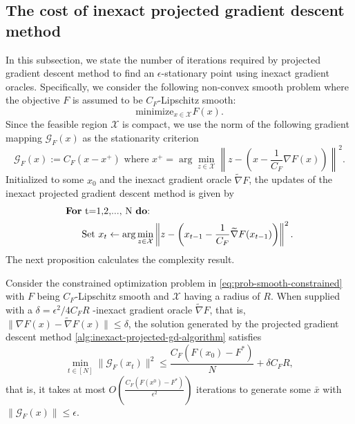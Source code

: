 \subsection{The cost of inexact projected gradient descent method}
In this subsection, we state the number of iterations required by  projected gradient descent method to find an $\epsilon$-stationary point using inexact gradient oracles. Specifically, we consider the following non-convex smooth problem  where the objective $F$ is assumed to be $C_F$-Lipschitz smooth: 
\begin{equation}\label{eq:prob-smooth-constrained}
    \mbox{minimize}_{x\in \mathcal{X}} F(x).
\end{equation}
Since the feasible region $\mathcal{X}$ is compact, we use the norm of the following gradient mapping $\mathcal{G}_F(x)$ as the stationarity criterion 
\begin{equation}\label{eq:gradient-mapping}
    \mathcal{G}_F(x):= {C_F}(x - x^+) \text{ where } x^+ = \arg\min_{z\in \mathcal{X}} \left\| z-\left(x -\frac{1}{C_F} \nabla F(x)\right)\right\|^2.
\end{equation}
Initialized to some $x_0$ and the inexact gradient oracle $\widetilde{\nabla} F$, the updates of the inexact projected gradient descent method is given by 
\begin{equation}\label{alg:inexact-projected-gd-algorithm}
    \begin{split}
        \text{\textbf{For}}&\text{ t=1,2,..., N \textbf{do}:}\\
        &\text{Set } x_t \leftarrow \arg\min_{z\in \mathcal{X}} \left\| z- \left(x_{t-1}-\frac{1}{C_F}\widetilde{\nabla} F(x_{t-1})\right)\right\|^2.
    \end{split}
\end{equation}
The next proposition calculates the complexity result. 
\begin{proposition}\label{pr:inexact-pgd}
    Consider the constrained optimization problem in \eqref{eq:prob-smooth-constrained} with $F$ being $C_F$-Lipschitz smooth and $\mathcal{X}$ having a radius of $R$. When supplied with a $\delta=\epsilon^2/4C_F R$ -inexact gradient oracle $\widetilde{\nabla} F$, that is, $\|\nabla F(x)-\widetilde{\nabla}F(x)\|\leq \delta$, the solution generated by the projected gradient descent method \eqref{alg:inexact-projected-gd-algorithm} satisfies 
    $$\min_{t \in [N]} \| \mathcal{G}_F(x_t)\|^2 \leq \frac{C_F(F(x_0)-F^*)}{N}+\delta C_F R,$$
    that is, it takes at most $O(\frac{C_F (F(x^0)-F^*)}{\epsilon^2})$ iterations to generate some $\bar x$ with $\|\mathcal{G}_F(x)\|\leq \epsilon$.

\end{proposition}
